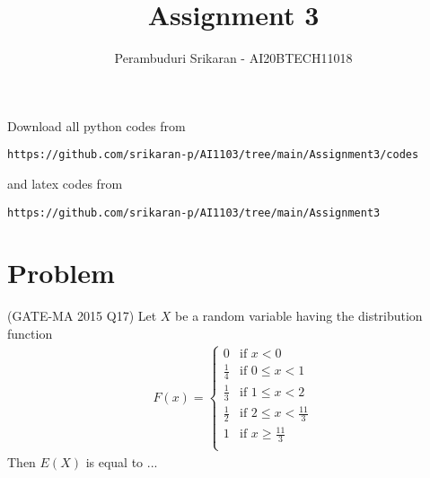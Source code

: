 \documentclass[journal,12pt,twocolumn]{IEEEtran}
\begin{document}
\let\StandardTheFigure\thefigure
\let\vec\mathbf
\renewcommand{\thefigure}{\theproblem}
\def\putbox#1#2#3{\makebox[0in][l]{\makebox[#1][l]{}\raisebox{\baselineskip}[0in][0in]{\raisebox{#2}[0in][0in]{#3}}}}
     \def\rightbox#1{\makebox[0in][r]{#1}}
     \def\centbox#1{\makebox[0in]{#1}}
     \def\topbox#1{\raisebox{-\baselineskip}[0in][0in]{#1}}
     \def\midbox#1{\raisebox{-0.5\baselineskip}[0in][0in]{#1}}
\vspace{3cm}
\title{Assignment 3}
\author{Perambuduri Srikaran - AI20BTECH11018}
\maketitle
\newpage
\bigskip
\renewcommand{\thefigure}{\theenumi}
\renewcommand{\thetable}{\theenumi}
Download all python codes from
\begin{lstlisting}
https://github.com/srikaran-p/AI1103/tree/main/Assignment3/codes
\end{lstlisting}
and latex codes from 
\begin{lstlisting}
https://github.com/srikaran-p/AI1103/tree/main/Assignment3
\end{lstlisting}
\section*{Problem}
(GATE-MA 2015 Q17) Let $X$ be a random variable having the distribution function
\begin{align}
F(x) = 
    \begin{cases} 
      0 & \text{if }x < 0 \\
      \frac{1}{4} & \text{if } 0\leq x < 1 \\
      \frac{1}{3} & \text{if } 1\leq x < 2 \\
      \frac{1}{2} & \text{if } 2\leq x < \frac{11}{3} \\
      1 & \text{if } x \geq \frac{11}{3} \\
   \end{cases}
\end{align}
Then $E(X)$ is equal to ...
\end{document}
